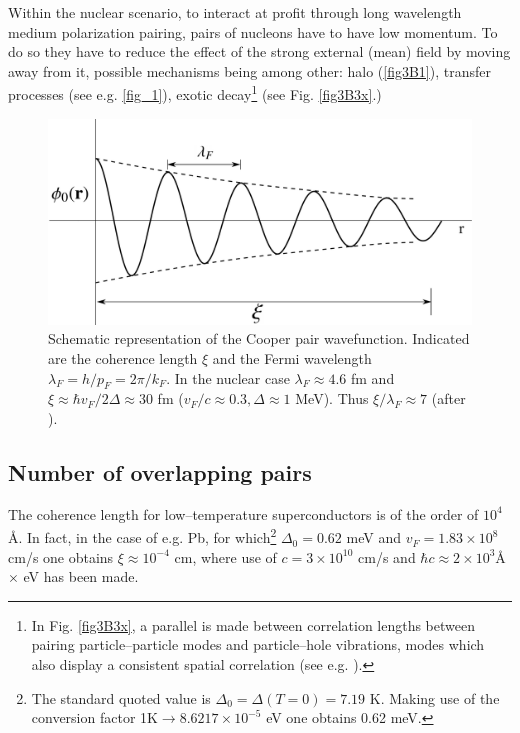 \begin{subappendices}
     
     Within the nuclear scenario, to interact at profit through long wavelength medium polarization pairing, pairs of nucleons have to have low momentum. To do so they have to reduce the effect of the strong external (mean) field by moving away from it, possible mechanisms being among other: halo (\ref{fig3B1}), transfer processes (see e.g. \ref{fig_1}), exotic decay\footnote{In Fig. \ref{fig3B3x}, a parallel is made between correlation lengths between pairing particle--particle modes and particle--hole vibrations, modes which also display a consistent spatial correlation (see e.g. \cite{Broglia:71}).} (see Fig. \ref{fig3B3x}.)    

 \begin{figure}[h]
 	\centerline{\includegraphics*[width=12cm,angle=0	]{nutshell/figs/fig3B2}}
 	\caption{Schematic representation of the Cooper pair wavefunction. Indicated are the coherence length $\xi$ and the Fermi wavelength $\lambda_F=h/p_F=2\pi/k_F$. In the nuclear case $\lambda_F\approx4.6$ fm and $\xi\approx \hbar v_F/2\Delta\approx30$ fm ($v_F/c\approx0.3, \Delta\approx 1$ MeV). Thus $\xi/\lambda_F\approx 7$ (after \cite{Weisskopf:81}).}\label{fig3B2}
 \end{figure}
 





\subsection{Number of overlapping pairs}
 

The coherence length for low--temperature superconductors is of the order of $10^4$\AA. In fact, in the case of e.g. Pb, for which\footnote{\label{foot75} The standard quoted value is $\Delta_0=\Delta(T=0)=7.19$ K. Making use of the conversion factor 1K$\rightarrow 8.6217\times10^{-5}$ eV one obtains 0.62 meV.} $\Delta_0=0.62$ meV and $v_F=1.83\times10^8$ cm/s one obtains $\xi\approx10^{-4}$ cm, where use of $c=3\times10^{10}$ cm/s and $\hbar c\approx 2\times10^3 $\AA$\times$  eV has been made. 



\end{subappendices}

